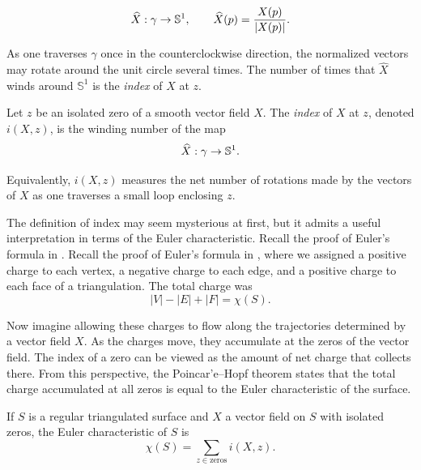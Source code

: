 $$\widehat{X} : \gamma \to \mathbb{S}^1,
\qquad
\widehat{X}(p)=\frac{X(p)}{|X(p)|}.
$$

As one traverses $\gamma$ once in the counterclockwise direction, 
the normalized vectors may rotate around the unit circle several times. 
The number of times that $\widehat{X}$ winds around $\mathbb{S}^1$ is 
 the \emph{index} of $X$ at $z$.
 
 \begin{definition}
Let $z$ be an isolated zero of a smooth vector field $X$. The \emph{index} of $X$ at $z$, 
denoted $i(X,z)$, is the winding number of the map
$$\widehat{X} : \gamma \to \mathbb{S}^1.$$

Equivalently, $i(X,z)$ measures the net number of rotations made by the vectors of $X$ as one traverses a small loop enclosing $z$.
\end{definition}
 
The definition of index may seem mysterious at first, but it admits a useful interpretation
 in terms of the Euler characteristic. Recall the proof of 
 Euler's formula in . 
 Recall the proof of Euler's formula in , where we assigned a positive charge to each vertex, a negative charge to each edge, and a positive charge to each face of a triangulation. The total charge was
$$|V|-|E|+|F|=\chi(S).$$

Now imagine allowing these charges to flow along the trajectories determined by a vector field $X$.
 As the charges move, they accumulate at the zeros of the vector field. 
 The index of a zero can be viewed as the amount of net charge that collects there. 
 From this perspective, the Poincar'e--Hopf theorem states that the total charge accumulated at all zeros is equal to the Euler characteristic of the surface.
 

 
 
\begin{theorem} \label{thm:poincare-index}

If $S$ is a regular triangulated surface and $X$ a vector field on $S$ with isolated zeros,
the Euler characteristic of $S$ is 
$$\chi(S)=\sum_{z\in \text{zeros}}i(X,z).$$
\end{theorem}

